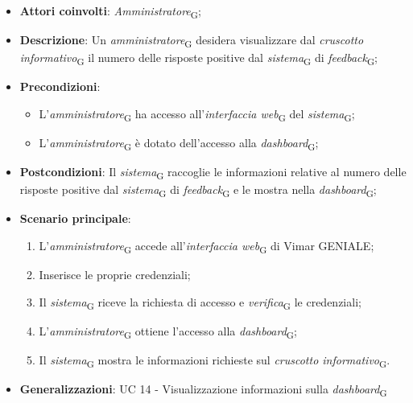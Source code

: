 \begin{itemize}
    \item \textbf{Attori coinvolti}: \textit{Amministratore}\textsubscript{G};
    \item \textbf{Descrizione}: Un \textit{amministratore}\textsubscript{G} desidera visualizzare dal \textit{cruscotto informativo}\textsubscript{G} il numero delle risposte positive dal \textit{sistema}\textsubscript{G} di \textit{feedback}\textsubscript{G};
    \item \textbf{Precondizioni}: 
        \begin{itemize}
            \item L’\textit{amministratore}\textsubscript{G} ha accesso all’\textit{interfaccia web}\textsubscript{G} del \textit{sistema}\textsubscript{G};
            \item L’\textit{amministratore}\textsubscript{G} è dotato dell’accesso alla \textit{dashboard}\textsubscript{G};
        \end{itemize}
    \item \textbf{Postcondizioni}: Il \textit{sistema}\textsubscript{G} raccoglie le informazioni relative al numero delle risposte positive dal \textit{sistema}\textsubscript{G} di \textit{feedback}\textsubscript{G} e le mostra nella \textit{dashboard}\textsubscript{G};
    \item \textbf{Scenario principale}:
    \begin{enumerate}
    \item L’\textit{amministratore}\textsubscript{G} accede all’\textit{interfaccia web}\textsubscript{G} di Vimar GENIALE;
    \item Inserisce le proprie credenziali;
    \item Il \textit{sistema}\textsubscript{G} riceve la richiesta di accesso e \textit{verifica}\textsubscript{G} le credenziali;
    \item L’\textit{amministratore}\textsubscript{G} ottiene l’accesso alla \textit{dashboard}\textsubscript{G};
    \item Il \textit{sistema}\textsubscript{G} mostra le informazioni richieste sul \textit{cruscotto informativo}\textsubscript{G}.
    \end{enumerate}
    \item \textbf{Generalizzazioni}: UC 14 - Visualizzazione informazioni sulla \textit{dashboard}\textsubscript{G}
\end{itemize}

